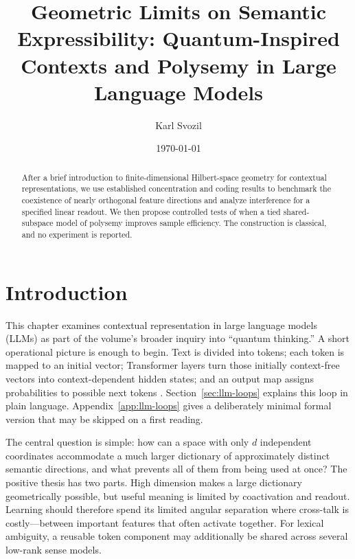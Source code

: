 \documentclass[
  aps,
  reprint,
  superscriptaddress,
  floatfix,
  nofootinbib,
  longbibliography
]{revtex4-2}
\begin{document}
\title{Geometric Limits on Semantic Expressibility: Quantum-Inspired Contexts and Polysemy in Large Language Models}

\author{Karl Svozil}

\date{\today}

\begin{abstract}
After a brief introduction to finite-dimensional Hilbert-space geometry for
contextual representations, we use established concentration and coding
results to benchmark the coexistence of nearly orthogonal feature directions
and analyze interference for a specified linear readout.  We then propose
controlled tests of when a tied shared-subspace model of polysemy improves
sample efficiency.  The construction is classical, and no experiment is
reported.
\end{abstract}

\maketitle


\section{Introduction}
\label{sec:intro}

This chapter examines contextual representation in large language models
(LLMs) as part of the volume's broader inquiry into ``quantum thinking.''  A
short operational picture is enough to begin.  Text is divided into tokens;
each token is mapped to an initial vector; Transformer layers turn those
initially context-free vectors into context-dependent hidden states; and an
output map assigns probabilities to possible next tokens
\cite{Vaswani-2017-Attention}.  Section~\ref{sec:llm-loops} explains this loop
in plain language.  Appendix~\ref{app:llm-loops} gives a deliberately minimal
formal version that may be skipped on a first reading.

The central question is simple: how can a space with only $d$ independent
coordinates accommodate a much larger dictionary of approximately distinct
semantic directions, and what prevents all of them from being used at once?
The positive thesis has two parts.  High dimension makes a large dictionary
geometrically possible, but useful meaning is limited by coactivation and
readout.  Learning should therefore spend its limited angular separation where
cross-talk is costly---between important features that often activate
together.  For lexical ambiguity, a reusable token component may additionally
be shared across several low-rank sense models.
\end{document}
